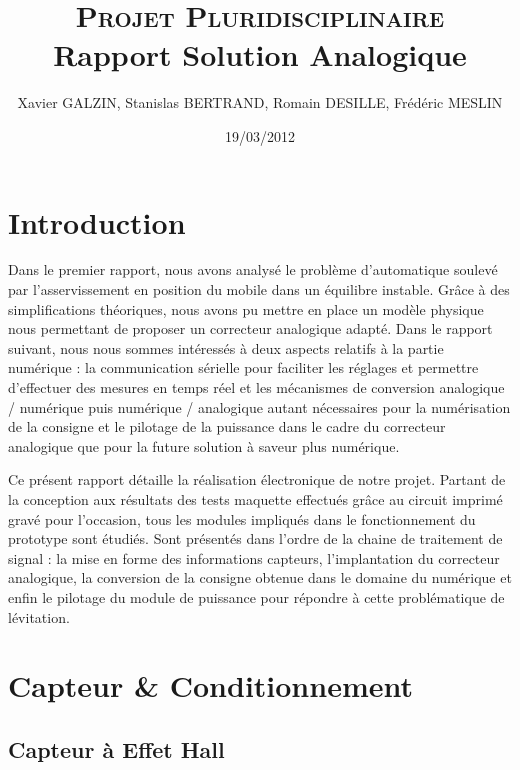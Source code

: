 \documentclass[11pt, french]{article} %
\title{\textsc{Projet Pluridisciplinaire} \\ Rapport Solution Analogique}
\author{Xavier GALZIN, Stanislas BERTRAND, Romain DESILLE, Frédéric MESLIN}
\date{19/03/2012}
\begin{document}
\maketitle

\pagebreak

\section*{Introduction}

Dans le premier rapport, nous avons analysé le problème d'automatique soulevé par l'asservissement en position du mobile dans un équilibre instable. Grâce à des simplifications théoriques, nous avons pu mettre en place un modèle physique nous permettant de proposer un correcteur analogique adapté. 
Dans le rapport suivant, nous nous sommes intéressés à deux aspects relatifs à la partie numérique : la communication sérielle pour faciliter les réglages et permettre d'effectuer des mesures en temps réel et les mécanismes de conversion analogique / numérique puis numérique / analogique autant nécessaires pour la numérisation de la consigne et le pilotage de la puissance dans le cadre du correcteur analogique que pour la future solution à saveur plus numérique. 
\medskip

Ce présent rapport détaille la réalisation électronique de notre projet. Partant de la conception aux résultats des tests maquette effectués grâce au circuit imprimé gravé pour l'occasion, tous les modules impliqués dans le fonctionnement du prototype sont étudiés. Sont présentés dans l'ordre de la chaine de traitement de signal : la mise en forme des informations capteurs, l'implantation du correcteur analogique, la conversion de la consigne obtenue dans le domaine du numérique et enfin le pilotage du module de puissance pour répondre à cette problématique de lévitation.


\section{Capteur \& Conditionnement}
\subsection{Capteur à Effet Hall}
\end{document}

